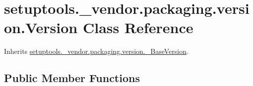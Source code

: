 \hypertarget{classsetuptools_1_1__vendor_1_1packaging_1_1version_1_1_version}{}\section{setuptools.\+\_\+vendor.\+packaging.\+version.\+Version Class Reference}
\label{classsetuptools_1_1__vendor_1_1packaging_1_1version_1_1_version}


Inherits \hyperlink{classsetuptools_1_1__vendor_1_1packaging_1_1version_1_1___base_version}{setuptools.\+\_\+vendor.\+packaging.\+version.\+\_\+\+Base\+Version}.

\subsection*{Public Member Functions}
